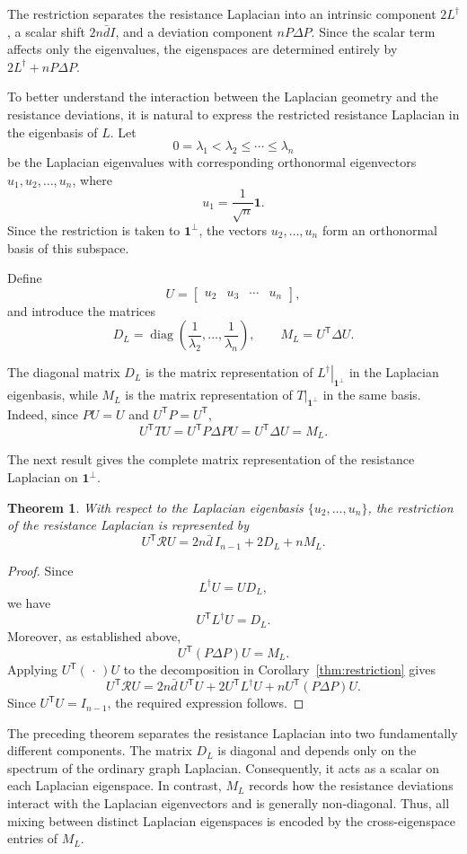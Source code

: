 \documentclass[12pt,a4paper]{amsart}
\newtheorem{theorem}{Theorem}[section]
\theoremstyle{remark}
\theoremstyle{definition}
\newcommand{\Rs}{\mathcal{R}}
\newcommand{\1}{\mathbf{1}}
\newcommand{\0}{\mathbf{0}}
\begin{document}
The restriction separates the resistance Laplacian into an intrinsic component $2L^\dagger$, a scalar shift $2n\bar d I$, and a deviation component $nP\Delta P$. 
Since the scalar term affects only the eigenvalues, the eigenspaces are determined entirely by $2L^\dagger +nP\Delta P$. 
    
To better understand the interaction between the Laplacian geometry and the resistance
deviations, it is natural to express the restricted resistance Laplacian in the eigenbasis of
$L$. Let
\[
0=\lambda_1<\lambda_2\le\cdots\le\lambda_n
\]
be the Laplacian eigenvalues with corresponding orthonormal eigenvectors
$u_1,u_2,\ldots,u_n$, where
\[
u_1=\frac1{\sqrt n}\mathbf1.
\]
Since the restriction is taken to $\mathbf1^\perp$, the vectors
$u_2,\ldots,u_n$
form an orthonormal basis of this subspace.

Define
\[
U=\begin{bmatrix}
u_2&u_3&\cdots&u_n
\end{bmatrix},
\]
and introduce the matrices
\[
D_L=\operatorname{diag}\!\left(
\frac{1}{\lambda_2},
\ldots,
\frac{1}{\lambda_n}
\right),
\qquad
M_L=U^{\mathsf T}\Delta U.
\]

The diagonal matrix $D_L$ is the matrix representation of
$\left.L^\dagger\right|_{\mathbf{1}^{\perp}}$ in the Laplacian
eigenbasis, while $M_L$ is the matrix representation of
$\left.T\right|_{\mathbf{1}^{\perp}}$ in the same basis. Indeed, since
$PU=U$ and $U^{\mathsf T}P=U^{\mathsf T}$,
\[
U^{\mathsf T}TU
=
U^{\mathsf T}P\Delta PU
=
U^{\mathsf T}\Delta U
=
M_L.
\]

The next result gives the complete matrix representation of the resistance Laplacian on $\mathbf1^\perp$.

\begin{theorem}\label{thm:lapbasis}
With respect to the Laplacian eigenbasis
$\{u_2,\ldots,u_n\}$, the restriction of the resistance Laplacian is
represented by
\[
U^{\mathsf T}\Rs U
=
2n\bar d\,I_{n-1}+2D_L+nM_L.
\]
\end{theorem}

\begin{proof}
Since
\[
L^\dagger U=UD_L,
\]
we have
\[
U^{\mathsf T}L^\dagger U=D_L.
\]
Moreover, as established above,
\[
U^{\mathsf T}(P\Delta P)U=M_L.
\]
Applying $U^{\mathsf T}(\,\cdot\,)U$ to the decomposition in
Corollary~\ref{thm:restriction} gives
\[
U^{\mathsf T}\Rs U
=
2n\bar d\,U^{\mathsf T}U
+
2U^{\mathsf T}L^\dagger U
+
nU^{\mathsf T}(P\Delta P)U.
\]
Since $U^{\mathsf T}U=I_{n-1}$, the required expression follows.
\end{proof}
The preceding theorem separates the resistance Laplacian into two
fundamentally different components. The matrix $D_L$ is diagonal and
depends only on the spectrum of the ordinary graph Laplacian.
Consequently, it acts as a scalar on each Laplacian eigenspace. In
contrast, $M_L$ records how the resistance deviations interact with
the Laplacian eigenvectors and is generally non-diagonal. Thus, all
mixing between distinct Laplacian eigenspaces is encoded by the
cross-eigenspace entries of $M_L$.
\end{document}
